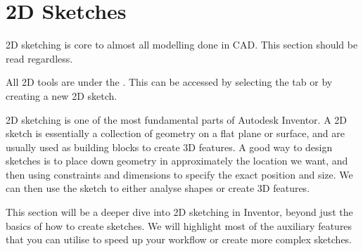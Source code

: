 \chapter{2D Sketches}

\begin{when-to-read}
    2D sketching is core to almost all modelling done in CAD. This section should be read regardless.
    \end{when-to-read}
    
\begin{where-to-find}
All 2D tools are under the . This can be accessed by selecting the  tab or by creating a new 2D sketch.
\end{where-to-find}

2D sketching is one of the most fundamental parts of Autodesk Inventor. A 2D sketch is essentially a collection of geometry on a flat plane or surface, and are usually used as building blocks to create 3D features. A good way to design sketches is to place down geometry in approximately the location we want, and then using constraints and dimensions to specify the exact position and size. We can then use the sketch to either analyse shapes or create 3D features.

This section will be a deeper dive into 2D sketching in Inventor, beyond just the basics of how to create sketches. We will highlight most of the auxiliary features that you can utilise to speed up your workflow or create more complex sketches.

